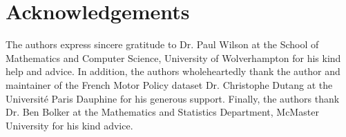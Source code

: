 \documentclass[11pt,letterpaper]{article}
\numberwithin{equation}{section}
\numberwithin{equation}{section}
\numberwithin{equation}{section}
\begin{document}
\section*{Acknowledgements}
The authors express sincere gratitude to Dr. Paul Wilson at the School of Mathematics and Computer Science, University of Wolverhampton for his kind help and advice. In addition, the authors wholeheartedly thank the author and maintainer of the French Motor Policy dataset Dr. Christophe Dutang at the  Universit\' e Paris Dauphine for his generous support. Finally, the authors thank Dr. Ben Bolker at the Mathematics and Statistics Department, McMaster University for his kind advice.


\end{document}
